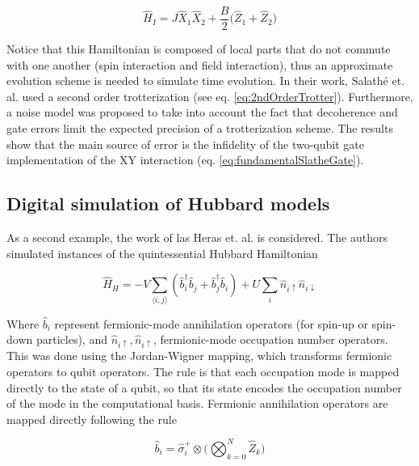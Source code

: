   \begin{equation}
    \hat{H}_I = J \hat{X}_1 \hat{X}_2 + \frac{B}{2}\bigg(\hat{Z}_1 + \hat{Z}_2 \bigg)
    \label{eq:IsingSlathe}
  \end{equation}

  Notice that this Hamiltonian is composed of local parts that do not commute with one another (spin interaction and field interaction), thus an approximate evolution scheme is needed to simulate time evolution. In their work, Salathé et. al. \cite{HeisenbergSimulLasHeras} used a second order trotterization (see eq. \ref{eq:2ndOrderTrotter}). Furthermore, a noise model was proposed to take into account the fact that decoherence and gate errors limit the expected precision of a trotterization scheme. The results show that the main source of error is the infidelity of the two-qubit gate implementation of the XY interaction (eq. \ref{eq:fundamentalSlatheGate}).

  \subsection{Digital simulation of Hubbard models}

  As a second example, the work of las Heras et. al. is considered\cite{HubbardSimulLasHeras}. The authors simulated instances of the quintessential Hubbard Hamiltonian

  \begin{equation}
    \hat{H}_H = -V \sum_{\langle i,j\rangle} (\hat{b}_i^{\dagger}\hat{b}_j + \hat{b}_j^{\dagger}\hat{b}_i) + U \sum_i \hat{n}_{i\uparrow}\hat{n}_{i\downarrow}
    \label{eq:HubbardHamiltonian}
  \end{equation}

  Where $\hat{b}_i$ represent fermionic-mode annihilation operators (for spin-up or spin-down particles), and $\hat{n}_{i\uparrow},\hat{n}_{i\uparrow}$, fermionic-mode occupation number operators. This was done using the Jordan-Wigner mapping, which transforms fermionic operators to qubit operators. The rule is that each occupation mode is mapped directly to the state of a qubit, so that its state encodes the occupation number of the mode in the computational basis. Fermionic annihilation operators are mapped directly following the rule \cite{Mastersthesis}

  \begin{equation}
    \hat{b}_i = \hat{\sigma}_i^{+} \otimes \Bigg(\bigotimes_{k=0}^{N} \hat{Z}_k \Bigg)
    \label{eq:JWT}
  \end{equation}

